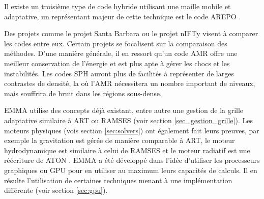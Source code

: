 Il existe un troisième type de code hybride utilisant une maille mobile et adaptative, un représentant majeur de cette technique est le code AREPO \citep{2010MNRAS.401..791S}.


Des projets comme le projet Santa Barbara \citep{1999ApJ...525..554F} ou le projet nIFTy \citep{sembolini_nifty_2015} visent à comparer les codes entre eux.
Certain projets \citep{2007MNRAS.380..963A, oshea_comparing_2005} se focalisent sur la comparaison des méthodes.
D'une manière générale, il en ressort qu'un code \ac{AMR} offre une meilleur conservation de l’énergie et est plus apte à gérer les chocs et les instabilités.%
Les codes \ac{SPH} auront plus de facilités à représenter de larges contrastes de densité, la où l'\ac{AMR} nécessitera un nombre important de niveaux, mais souffrira de bruit dans les régions sous-dense.

EMMA utilise des concepts déjà existant, entre autre une gestion de la grille adaptative similaire à ART ou RAMSES (voir section \ref{sec_gestion_grille}).
Les moteurs physiques (vois section \ref{sec:solvers}) ont également fait leurs preuves, par exemple la gravitation est gérée de manière comparable à ART, le moteur hydrodynamique est similaire à celui de RAMSES et le moteur radiatif est une réécriture de ATON \citep{aubert_radiative_2008}.
EMMA a été développé dans l'idée d'utiliser les processeurs graphiques ou \ac{GPU} pour en utiliser au maximum leurs capacités de calculs.
Il en résulte l'utilisation de certaines techniques menant à une implémentation différente (voir section \ref{sec:gpu}).


%

